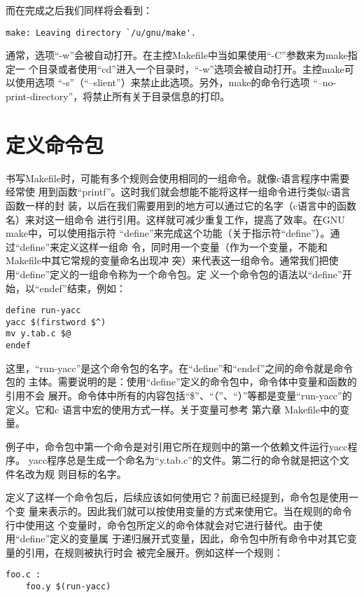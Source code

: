 \noindent
而在完成之后我们同样将会看到：
\begin{Verbatim}[]
make: Leaving directory `/u/gnu/make'.
\end{Verbatim}

通常，选项“-w”会被自动打开。在主控Makefile中当如果使用“-C”参数来为make指定一
个目录或者使用“cd”进入一个目录时，“-w”选项会被自动打开。主控make可以使用选项
“-s”（“--slient”）来禁止此选项。另外，make的命令行选项
“--no-print-directory”，将禁止所有关于目录信息的打印。


\section{定义命令包}
书写Makefile时，可能有多个规则会使用相同的一组命令。就像c语言程序中需要经常使
用到函数“printf”。这时我们就会想能不能将这样一组命令进行类似c语言函数一样的封
装，以后在我们需要用到的地方可以通过它的名字（c语言中的函数名）来对这一组命令
进行引用。这样就可减少重复工作，提高了效率。在GNU make中，可以使用指示符
“define”来完成这个功能（关于指示符“define”）。通过“define”来定义这样一组命
令，同时用一个变量（作为一个变量，不能和Makefile中其它常规的变量命名出现冲
突）来代表这一组命令。通常我们把使用“define”定义的一组命令称为一个命令包。定
义一个命令包的语法以“define”开始，以“endef”结束，例如：

\begin{Verbatim}[]
define run-yacc
yacc $(firstword $^)
mv y.tab.c $@
endef
\end{Verbatim}

这里，“run-yacc”是这个命令包的名字。在“define”和“endef”之间的命令就是命令包的
主体。需要说明的是：使用“define”定义的命令包中，命令体中变量和函数的引用不会
展开。命令体中所有的内容包括“\$”、“（”、“）”等都是变量“run-yacc”的定义。它和c
语言中宏的使用方式一样。关于变量可参考 第六章 Makefile中的变量。

例子中，命令包中第一个命令是对引用它所在规则中的第一个依赖文件运行yacc程序。
yacc程序总是生成一个命名为“y.tab.c”的文件。第二行的命令就是把这个文件名改为规
则目标的名字。

定义了这样一个命令包后，后续应该如何使用它？前面已经提到，命令包是使用一个变
量来表示的。因此我们就可以按使用变量的方式来使用它。当在规则的命令行中使用这
个变量时，命令包所定义的命令体就会对它进行替代。由于使用“define”定义的变量属
于递归展开式变量，因此，命令包中所有命令中对其它变量的引用，在规则被执行时会
被完全展开。例如这样一个规则：
\begin{Verbatim}[]
foo.c :
    foo.y $(run-yacc)
\end{Verbatim}

